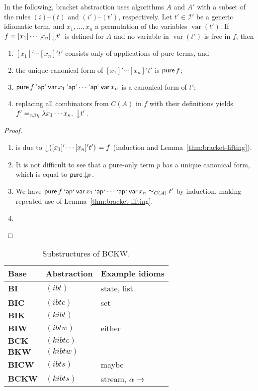 \begin{theorem}\label{thm:unlifting}
In the following, bracket abstraction uses algorithms $A$ and $A'$ with
a subset of the rules $(i)$--$(t)$ and $(i')$--$(t')$, respectively.
Let $t' \in \mathcal{I}'$ be a generic idiomatic term, and $x_1,\dots,x_n$
a permutation of the variables $\operatorname{var}(t')$.
If $f = [x_1]\cdots[x_n]\left\downarrow t'\right.$ is defined for $A$ and no variable in
$\operatorname{var}(t')$ is free in $f$, then
\begin{enumerate}
\item $[x_1]'\cdots[x_n]'t'$ consists only of applications of pure terms, and
\item the unique canonical form of $[x_1]'\cdots[x_n]'t'$ is $\operatorname{\mathsf{pure}} f$;
\item $\operatorname{\mathsf{pure}} f \mathbin{\mathsf{`ap`}} \operatorname{\mathsf{var}} x_1 \mathbin{\mathsf{`ap`}} \cdots \mathbin{\mathsf{`ap`}} \operatorname{\mathsf{var}} x_n$ is a canonical
	form of $t'$;
\item replacing all combinators from $C(A)$ in $f$ with their definitions
	yields $f' =_{\alpha\beta\eta} \lambda x_1\cdots x_n.\>\left\downarrow t'\right.$.
\end{enumerate}
\end{theorem}
\begin{proof}
\begin{enumerate}
\item is due to $\left\downarrow ([x_1]'\cdots[x_n]'t')\right. = f$ (induction and
	Lemma~\ref{thm:bracket-lifting}).
\item It is not difficult to see that a pure-only term $p$ has a unique canonical
	form, which is equal to $\operatorname{\mathsf{pure}} \left\downarrow p\right.$.
\item We have $\operatorname{\mathsf{pure}} f \mathbin{\mathsf{`ap`}} \operatorname{\mathsf{var}} x_1 \mathbin{\mathsf{`ap`}} \cdots \mathbin{\mathsf{`ap`}} \operatorname{\mathsf{var}} x_n \simeq_{C(A)} t'$
	by induction, making repeated use of Lemma~\ref{thm:bracket-lifting}.
\item \todo
\end{enumerate}
\end{proof}

\begin{table}\centering
\begin{tabular}{lll} Base & Abstraction & Example idioms \\
\hline
$\mathbf{BI}$ & $(ibt)$ & state, list \\
$\mathbf{BIC}$ & $(ibtc)$ & set \\
$\mathbf{BIK}$ & $(kibt)$ & \\
$\mathbf{BIW}$ & $(ibtw)$ & either \\
$\mathbf{BCK}$ & $(kibtc)$ & \\
$\mathbf{BKW}$ & $(kibtw)$ & \\
$\mathbf{BICW}$ & $(ibts)$ & maybe \\
$\mathbf{BCKW}$ & $(kibts)$ & stream, $\alpha \to$ \\
\end{tabular}
\caption{Substructures of BCKW.}
\label{tab:combinator-bases}
\end{table}

